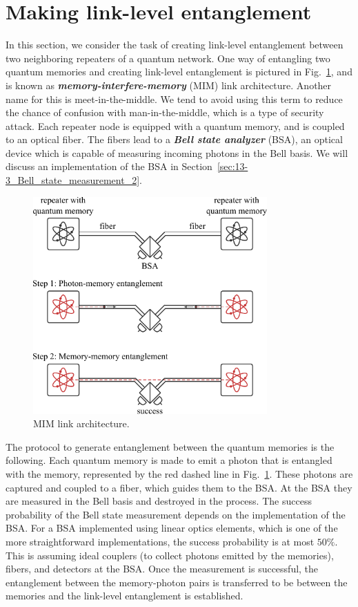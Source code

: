 \section{Making link-level entanglement}
\label{sec:12-2_making_link_level_rantanglement}

In this section, we consider the task of creating link-level entanglement between two neighboring repeaters of a quantum network.
One way of entangling two quantum memories and creating link-level entanglement is pictured in Fig.~\ref{fig:12-2_MIM}, and is known as \textit{\textbf{memory-interfere-memory}} (MIM) link architecture.
Another name for this is meet-in-the-middle.  We tend to avoid using this term to reduce the chance of confusion with man-in-the-middle, which is a type of security attack.
Each repeater node is equipped with a quantum memory, and is coupled to an optical fiber.
The fibers lead to a \textit{\textbf{Bell state analyzer}} (BSA), an optical device which is capable of measuring incoming photons in the Bell basis.
We will discuss an implementation of the BSA in Section~\ref{sec:13-3_Bell_state_measurement_2}.

\begin{figure}[t]
    \centering
    \includegraphics[width=0.8\textwidth]{lesson12/12-2_MIM.pdf}
    \caption[MIM link architecture]{MIM link architecture.}
    \label{fig:12-2_MIM}
\end{figure}

The protocol to generate entanglement between the quantum memories is the following.
Each quantum memory is made to emit a photon that is entangled with the memory, represented by the red dashed line in Fig.~\ref{fig:12-2_MIM}.
These photons are captured and coupled to a fiber, which guides them to the BSA.
At the BSA they are measured in the Bell basis and destroyed in the process.
The success probability of the Bell state measurement depends on the implementation of the BSA.
For a BSA implemented using linear optics elements, which is one of the more straightforward implementations, the success probability is at most $50\%$.
This is assuming ideal couplers (to collect photons emitted by the memories), fibers, and detectors at the BSA.
Once the measurement is successful, the entanglement between the memory-photon pairs is transferred to be between the memories and the link-level entanglement is established.

